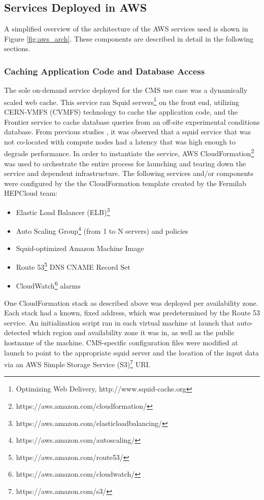 \documentclass[twocolumn]{svjour3}          %
\begin{document}
\subsection{Services Deployed in AWS}

A simplified overview of the architecture of the AWS services used is shown in Figure \ref{fig:aws_arch}. These components are described in detail in the
following sections.

\subsubsection{Caching Application Code and Database Access}
The sole on-demand service deployed for the CMS use case was a dynamically scaled web cache.  This service ran Squid servers\footnote{Optimizing Web Delivery, http://www.squid-cache.org} on the front end, utilizing CERN-VMFS (CVMFS)
technology \cite{cvmfs} to cache the application code, and the Frontier service \cite{frontier} to cache database queries from an off-site experimental conditions
database. From previous studies \cite{Timm_chep_2015}, it was observed that a squid service that was not co-located with compute nodes had a latency that was high enough to degrade performance. In order to instantiate the service, AWS CloudFormation\footnote{https://aws.amazon.com/cloudformation/} was used to orchestrate the entire process for launching and tearing down the service and dependent infrastructure. The following services and/or components were configured by the the CloudFormation template created by the Fermilab HEPCloud team:
\begin{itemize}
\item Elastic Load Balancer (ELB)\footnote{https://aws.amazon.com/elasticloadbalancing/}
\item Auto Scaling Group\footnote{https://aws.amazon.com/autoscaling/} (from 1 to N servers) and policies
\item Squid-optimized Amazon Machine Image
\item Route 53\footnote{https://aws.amazon.com/route53/} DNS CNAME Record Set
\item CloudWatch\footnote{https://aws.amazon.com/cloudwatch/} alarms
\end{itemize}

One CloudFormation stack as described above was deployed per availability zone. Each stack had a known, fixed address, which was predetermined by the Route 53 service. An initialization script ran in each virtual machine at launch that auto-detected which region and availability zone it was in, as well as the public hostname of the machine. CMS-specific configuration files
were modified at launch to point to the appropriate squid server and the location of the input data via an AWS Simple Storage Service (S3)\footnote{https://aws.amazon.com/s3/} URI.
\end{document}
